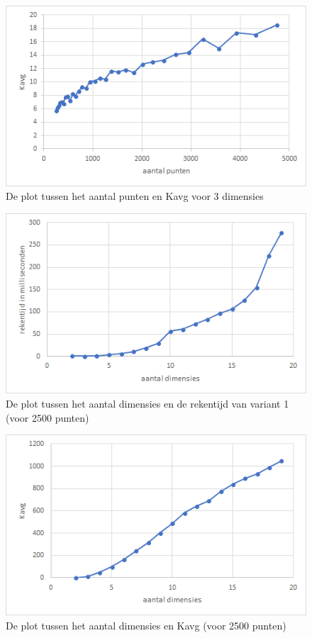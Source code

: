 \documentclass[12pt]{article}
\begin{document}
\begin{figure}
\includegraphics[width=\textwidth]{punten-Kavgdim3.png}
\caption{De plot tussen het aantal punten en Kavg voor 3 dimensies}
\end{figure}

\begin{figure}
\includegraphics[width=\textwidth]{dim-var1-rekentijd.png}
\caption{De plot tussen het aantal dimensies en de rekentijd van variant 1 (voor 2500 punten)}
\end{figure}

\begin{figure}
\includegraphics[width=\textwidth]{dim-Kavg.png}
\caption{De plot tussen het aantal dimensies en Kavg (voor 2500 punten)}
\end{figure}
\end{document}
